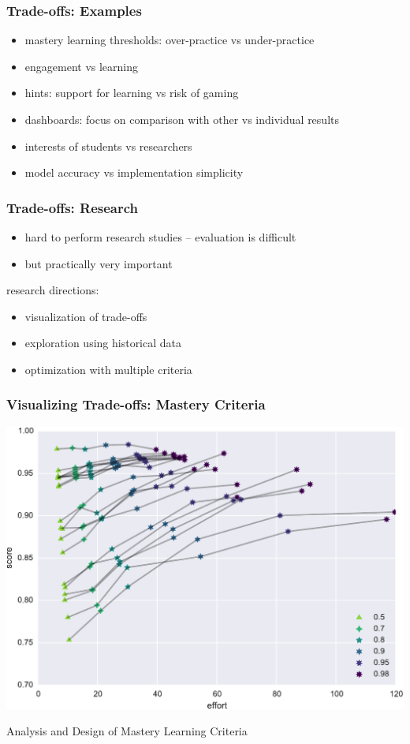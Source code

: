 \documentclass[bigger]{beamer}
\begin{document}
\begin{frame}
  \frametitle{Trade-offs: Examples}

  \begin{itemize}
  \item mastery learning thresholds: over-practice vs under-practice
  \item engagement vs learning
  \item hints: support for learning vs risk of gaming
  \item dashboards: focus on comparison with other vs individual results
  \item interests of students vs researchers
  \item model accuracy vs implementation simplicity
  \end{itemize}
\end{frame}

\begin{frame}
  \frametitle{Trade-offs: Research}

  \begin{itemize}
  \item hard to perform research studies -- evaluation is difficult
  \item but practically very important
  \end{itemize}

  \bigskip
  research directions:
  \begin{itemize}
  \item visualization of trade-offs
  \item exploration using historical data
  \item optimization with multiple criteria
  \end{itemize}
\end{frame}

\begin{frame}
  \frametitle{Visualizing Trade-offs: Mastery Criteria}

  \begin{center}
    \includegraphics[width=.8\linewidth]{uc-effort-score}
  \end{center}

  \begin{flushright}
    \footnotesize Analysis and Design of Mastery Learning Criteria
  \end{flushright}
\end{frame}
\end{document}

